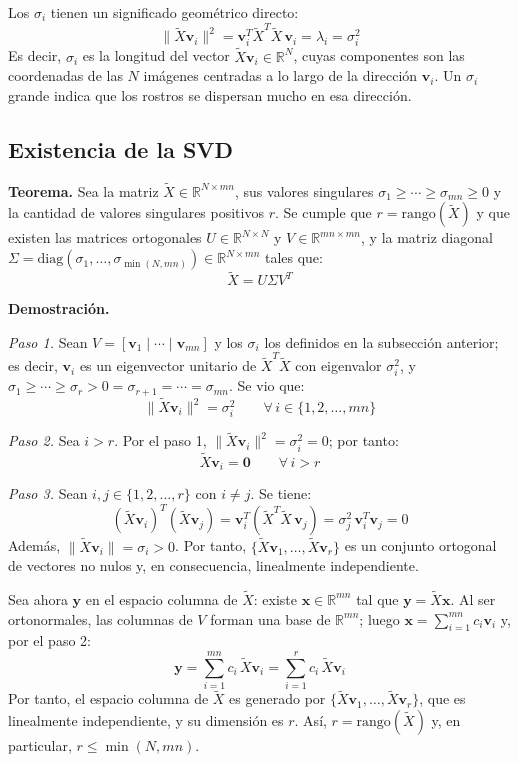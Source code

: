 Los $\sigma_i$ tienen un significado geométrico directo:
\[
\|\tilde{X}\mathbf{v}_i\|^2 = \mathbf{v}_i^T\tilde{X}^T\tilde{X}\,\mathbf{v}_i
= \lambda_i = \sigma_i^2
\]
Es decir, $\sigma_i$ es la longitud del vector $\tilde{X}\mathbf{v}_i \in
\mathbb{R}^N$, cuyas componentes son las coordenadas de las $N$ imágenes
centradas a lo largo de la dirección $\mathbf{v}_i$. Un $\sigma_i$ grande
indica que los rostros se dispersan mucho en esa dirección.


\subsection{Existencia de la SVD}

\textbf{Teorema.} Sea la matriz $\tilde{X} \in \mathbb{R}^{N \times mn}$,
sus valores singulares $\sigma_1 \geq \cdots \geq \sigma_{mn} \geq 0$ y la
cantidad de valores singulares positivos $r$. Se cumple que $r = \text{rango}(\tilde{X})$
y que existen las matrices ortogonales $U \in \mathbb{R}^{N \times N}$ y
$V \in \mathbb{R}^{mn \times mn}$, y la matriz diagonal
$\Sigma = \text{diag}(\sigma_1, \dots, \sigma_{\min(N, mn)}) \in \mathbb{R}^{N \times mn}$
tales que:
\[
\tilde{X} = U\Sigma V^T
\]

\textbf{Demostración.}

\textit{Paso 1.} Sean $V = [\mathbf{v}_1 \mid \cdots \mid \mathbf{v}_{mn}]$ y los
$\sigma_i$ los definidos en la subsección anterior; es decir, $\mathbf{v}_i$ es un
eigenvector unitario de $\tilde{X}^T\tilde{X}$ con eigenvalor $\sigma_i^2$, y
$\sigma_1 \geq \cdots \geq \sigma_r > 0 = \sigma_{r+1} = \cdots = \sigma_{mn}$.
Se vio que:
\[
\|\tilde{X}\mathbf{v}_i\|^2 = \sigma_i^2 \qquad \forall \, i \in \{1, 2, \dots, mn\}
\]

\textit{Paso 2.} Sea $i > r$. Por el paso 1, $\|\tilde{X}\mathbf{v}_i\|^2 = \sigma_i^2 = 0$;
por tanto:
\[
\tilde{X}\mathbf{v}_i = \mathbf{0} \qquad \forall \, i > r
\]

\textit{Paso 3.} Sean $i, j \in \{1, 2, \dots, r\}$ con $i \neq j$. Se tiene:
\[
(\tilde{X}\mathbf{v}_i)^T(\tilde{X}\mathbf{v}_j)
= \mathbf{v}_i^T(\tilde{X}^T\tilde{X}\,\mathbf{v}_j)
= \sigma_j^2\,\mathbf{v}_i^T\mathbf{v}_j = 0
\]
Además, $\|\tilde{X}\mathbf{v}_i\| = \sigma_i > 0$. Por tanto,
$\{\tilde{X}\mathbf{v}_1, \dots, \tilde{X}\mathbf{v}_r\}$ es un conjunto ortogonal de
vectores no nulos y, en consecuencia, linealmente independiente.

Sea ahora $\mathbf{y}$ en el espacio columna de $\tilde{X}$: existe
$\mathbf{x} \in \mathbb{R}^{mn}$ tal que $\mathbf{y} = \tilde{X}\mathbf{x}$. Al ser
ortonormales, las columnas de $V$ forman una base de $\mathbb{R}^{mn}$; luego
$\mathbf{x} = \sum_{i=1}^{mn} c_i\mathbf{v}_i$ y, por el paso 2:
\[
\mathbf{y} = \sum_{i=1}^{mn} c_i\,\tilde{X}\mathbf{v}_i
= \sum_{i=1}^{r} c_i\,\tilde{X}\mathbf{v}_i
\]
Por tanto, el espacio columna de $\tilde{X}$ es generado por
$\{\tilde{X}\mathbf{v}_1, \dots, \tilde{X}\mathbf{v}_r\}$, que es linealmente
independiente, y su dimensión es $r$. Así, $r = \text{rango}(\tilde{X})$ y, en
particular, $r \leq \min(N, mn)$.

